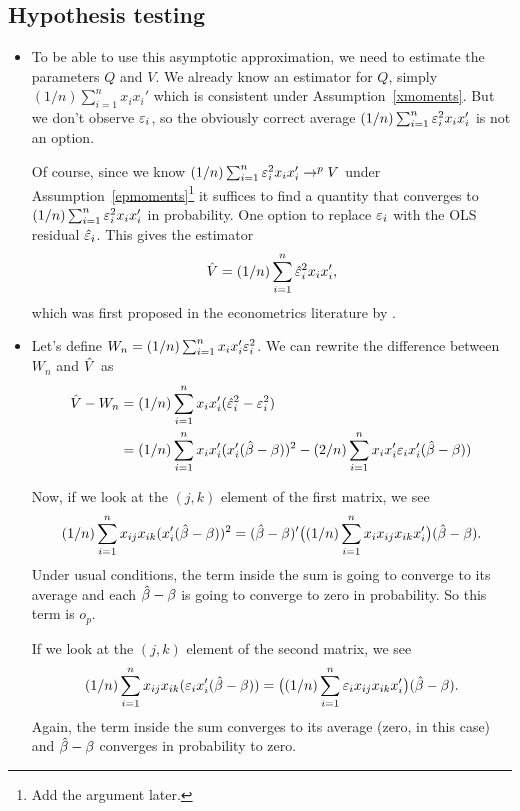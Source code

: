 \subsection{Hypothesis testing}

\begin{itemize}[leftmargin=0pt]

\item To be able to use this asymptotic approximation, we need to
  estimate the parameters $Q$ and $V$.  We already know an estimator
  for $Q$, simply $(1/n) \sum_{i=1}^n x_i x_i'$ which is consistent under
  Assumption~\ref{xmoments}.  But we don't observe $\varepsilon_i$, so the
  obviously correct average $(1/n) \sum_{i=1}^n \varepsilon_i^2 x_i x_i'$ is not
  an option.

  Of course, since we know $(1/n) \sum_{i=1}^n \varepsilon_i^2 x_i x_i' \to^p V$
  under Assumption~\ref{epmoments}\footnote{Add the argument later.}
  it suffices to find a quantity that converges to $(1/n) \sum_{i=1}^n
  \varepsilon_i^2 x_i x_i'$ in probability.  One option to replace $\varepsilon_i$ with
  the OLS residual $\hat{\varepsilon}_i$.  This gives the estimator
  \begin{equation*}
    \hat{V} = (1/n) \sum_{i=1}^n \hat{\varepsilon}_i^2 x_i x_i',
  \end{equation*}
  which was first proposed in the econometrics literature by
  \citet{Whi80}.

\item Let's define $W_n = (1/n) \sum_{i=1}^n x_i x_i' \varepsilon_i^2$.  We can
  rewrite the difference between $W_n$ and $\hat{V}$ as
  \begin{align*}
    \hat{V} - W_n
    &= (1/n) \sum_{i=1}^n x_i x_i' (\hat{\varepsilon}^2_i - \varepsilon_i^2) \\
    &= (1/n) \sum_{i=1}^n x_i x_i' (x_i'(\hat{\beta} - \beta))^2
    - (2/n) \sum_{i=1}^n  x_i x_i' \varepsilon_i x_i'(\hat{\beta} - \beta))
  \end{align*}

  Now, if we look at the $(j,k)$ element of the first matrix, we see
  \begin{equation*}
    (1/n) \sum_{i=1}^n x_{ij} x_{ik}(x_i'(\hat{\beta} - \beta))^2 =
    (\hat{\beta} - \beta)' \big((1/n) \sum_{i=1}^n x_i x_{ij} x_{ik} x_{i}'\big) (\hat{\beta}- \beta).
  \end{equation*}
  Under usual conditions, the term inside the sum is going to converge
  to its average and each $\hat{\beta} - \beta$ is going to converge to zero in
  probability.  So this term is $o_p$.

  If we look at the $(j,k)$ element of the second matrix, we see
  \begin{equation*}
    (1/n) \sum_{i=1}^n x_{ij} x_{ik}(\varepsilon_i x_i'(\hat{\beta} - \beta)) =
    \big((1/n) \sum_{i=1}^n \varepsilon_i x_{ij} x_{ik} x_{i}'\big) (\hat{\beta}- \beta).
  \end{equation*}
  Again, the term inside the sum converges to its average (zero, in
  this case) and $\hat{\beta} - \beta$ converges in probability to zero.


\end{itemize}
